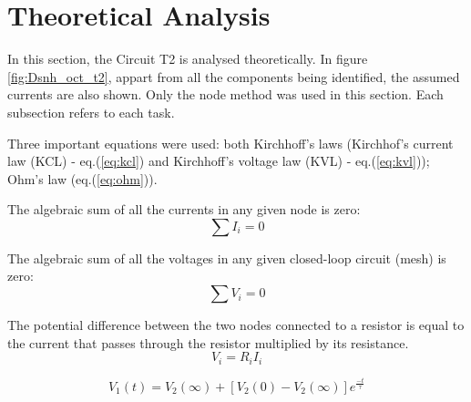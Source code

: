 
\section{Theoretical Analysis}
\label{sec:analysis}



In this section, the Circuit T2 is analysed theoretically. In figure \ref{fig:Dsnh_oct_t2},
appart from all the components being identified, the assumed currents are also shown.
Only the node method was used in this section. Each subsection refers to each task.


Three important equations were used: both Kirchhoff's laws (Kirchhof's current law (KCL)
- eq.(\ref{eq:kcl}) and Kirchhoff's voltage law (KVL) - eq.(\ref{eq:kvl})); Ohm's law
(eq.(\ref{eq:ohm})).

The algebraic sum of all the currents in any given node is zero:
\begin{equation}
	\sum I_i = 0
	\label{eq:kcl}
\end{equation}

The algebraic sum of all the voltages in any given closed-loop circuit (mesh) is zero:
\begin{equation}
	\sum V_i = 0
	\label{eq:kvl}
\end{equation}

The potential difference between the two nodes connected to a resistor is equal to the current that 
passes through the resistor multiplied by its resistance.
\begin{equation}
	V_i = R_iI_i
	\label{eq:ohm}
\end{equation}

\begin{equation}
	V_1(t) = V_2(\infty) + [V_2(0) - V_2(\infty)]e^{\frac{-t}{\tau}}
\end{equation}



